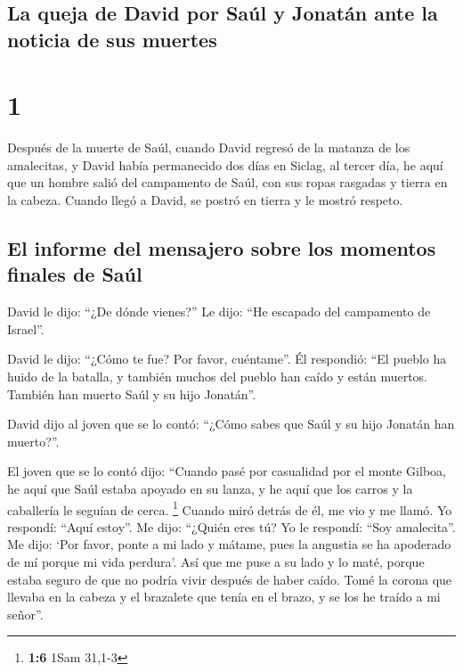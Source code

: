 \hypertarget{la-queja-de-david-por-sauxfal-y-jonatuxe1n-ante-la-noticia-de-sus-muertes}{%
\subsection{La queja de David por Saúl y Jonatán ante la noticia de sus
muertes}\label{la-queja-de-david-por-sauxfal-y-jonatuxe1n-ante-la-noticia-de-sus-muertes}}

\hypertarget{section}{%
\section{1}\label{section}}

 Después de la muerte de Saúl, cuando David regresó de la
matanza de los amalecitas, y David había permanecido dos días en Siclag,
 al tercer día, he aquí que un hombre salió del campamento
de Saúl, con sus ropas rasgadas y tierra en la cabeza. Cuando llegó a
David, se postró en tierra y le mostró respeto.

\hypertarget{el-informe-del-mensajero-sobre-los-momentos-finales-de-sauxfal}{%
\subsection{El informe del mensajero sobre los momentos finales de
Saúl}\label{el-informe-del-mensajero-sobre-los-momentos-finales-de-sauxfal}}

 David le dijo: ``¿De dónde vienes?'' Le dijo: ``He
escapado del campamento de Israel''.

 David le dijo: ``¿Cómo te fue? Por favor, cuéntame''. Él
respondió: ``El pueblo ha huido de la batalla, y también muchos del
pueblo han caído y están muertos. También han muerto Saúl y su hijo
Jonatán''.

 David dijo al joven que se lo contó: ``¿Cómo sabes que
Saúl y su hijo Jonatán han muerto?''.

 El joven que se lo contó dijo: ``Cuando pasé por
casualidad por el monte Gilboa, he aquí que Saúl estaba apoyado en su
lanza, y he aquí que los carros y la caballería le seguían de cerca.
\footnote{\textbf{1:6} 1Sam 31,1-3}  Cuando miró detrás de
él, me vio y me llamó. Yo respondí: ``Aquí estoy''.  Me
dijo: ``¿Quién eres tú? Yo le respondí: ``Soy amalecita''.
 Me dijo: `Por favor, ponte a mi lado y mátame, pues la
angustia se ha apoderado de mí porque mi vida perdura'. 
Así que me puse a su lado y lo maté, porque estaba seguro de que no
podría vivir después de haber caído. Tomé la corona que llevaba en la
cabeza y el brazalete que tenía en el brazo, y se los he traído a mi
señor''.

